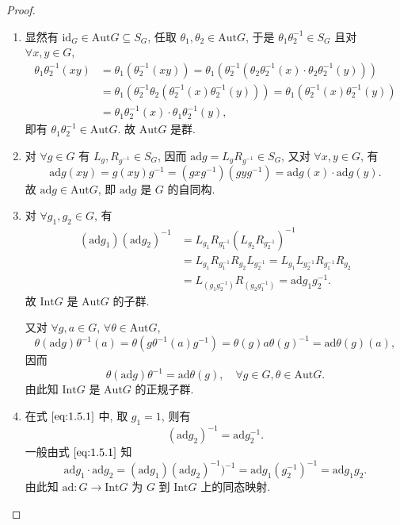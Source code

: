 \documentclass[../../main.tex]{subfiles}
\begin{document}
\begin{proof}
\begin{enumerate}[(1)]
\item 显然有 \( \text{id}_G \in \text{Aut}G \subseteq S_G \), 任取 \( \theta_1, \theta_2 \in \text{Aut}G \), 于是 \( \theta_1\theta_2^{-1} \in S_G \) 且对 \( \forall x,y \in G \),
\begin{align*}
\theta_1\theta_2^{-1}(xy) &= \theta_1(\theta_2^{-1}(xy)) = \theta_1(\theta_2^{-1}(\theta_2\theta_2^{-1}(x) \cdot \theta_2\theta_2^{-1}(y))) \\
&= \theta_1(\theta_2^{-1}\theta_2(\theta_2^{-1}(x)\theta_2^{-1}(y))) = \theta_1(\theta_2^{-1}(x)\theta_2^{-1}(y)) \\
&= \theta_1\theta_2^{-1}(x) \cdot \theta_1\theta_2^{-1}(y),
\end{align*}
即有 \( \theta_1\theta_2^{-1} \in \text{Aut}G \). 故 \( \text{Aut}G \) 是群.

\item 对 \( \forall g \in G \) 有 \( L_g, R_{g^{-1}} \in S_G \), 因而 \( \text{ad}g = L_gR_{g^{-1}} \in S_G \), 又对 \( \forall x,y \in G \), 有
\[
\text{ad}g(xy) = g(xy)g^{-1} = (gxg^{-1})(gyg^{-1}) = \text{ad}g(x) \cdot \text{ad}g(y).
\]
故 \( \text{ad}g \in \text{Aut}G \), 即 \( \text{ad}g \) 是 \( G \) 的自同构.

\item 对 \( \forall g_1,g_2 \in G \), 有
\begin{align}
(\text{ad}g_1)(\text{ad}g_2)^{-1} &= L_{g_1}R_{g_1^{-1}}(L_{g_2}R_{g_2^{-1}})^{-1} \nonumber \\
&= L_{g_1}R_{g_1^{-1}}R_{g_2}L_{g_2^{-1}} = L_{g_1}L_{g_2^{-1}}R_{g_1^{-1}}R_{g_2} \nonumber \\
&= L_{(g_1g_2^{-1})}R_{(g_2g_1^{-1})} = \text{ad}g_1g_2^{-1}. \label{eq:1.5.1}
\end{align}
故 \( \text{Int}G \) 是 \( \text{Aut}G \) 的子群.

又对 \( \forall g,a \in G \), \( \forall \theta \in \text{Aut}G \),
\[
\theta(\text{ad}g)\theta^{-1}(a) = \theta(g\theta^{-1}(a)g^{-1}) = \theta(g)a\theta(g)^{-1} = \text{ad}\theta(g)(a),
\]
因而
\[
\theta(\text{ad}g)\theta^{-1} = \text{ad}\theta(g), \quad \forall g \in G, \theta \in \text{Aut}G. \label{eq:1.5.2}
\]
由此知 \( \text{Int}G \) 是 \( \text{Aut}G \) 的正规子群.

\item 在式 \(\eqref{eq:1.5.1}\) 中, 取 \( g_1 = 1 \), 则有
\[
(\text{ad}g_2)^{-1} = \text{ad}g_2^{-1}.
\]
一般由式 \(\eqref{eq:1.5.1}\) 知
\[
\text{ad}g_1 \cdot \text{ad}g_2 = (\text{ad}g_1)(\text{ad}g_2)^{-1})^{-1} = \text{ad}g_1(g_2^{-1})^{-1} = \text{ad}g_1g_2.
\]
由此知 \( \text{ad}: G \to \text{Int}G \) 为 \( G \) 到 \( \text{Int}G \) 上的同态映射.
\end{enumerate}
\end{proof}
\end{document}
